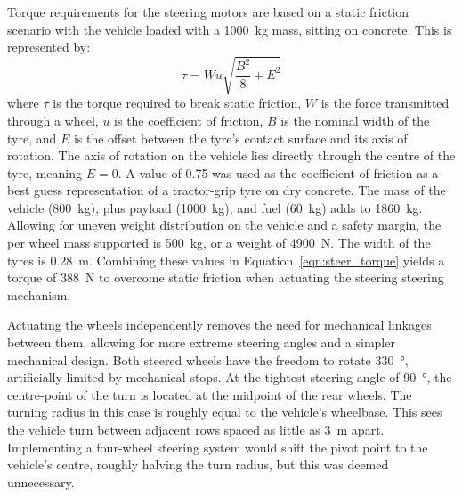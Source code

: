 \documentclass[preprint,authoryear,12pt]{elsarticle}
\begin{document}

        Torque requirements for the steering motors are based on a static friction scenario with the vehicle loaded with a \SI{1000}{\kilo\gram} mass, sitting on concrete.
        This is represented by:
        \begin{equation}
        \label{eqn:steer_torque}
        \tau = W u \sqrt{\frac{B^2}{8} + E^2}
        \end{equation}
        where $\tau$ is the torque required to break static friction, $W$ is the force transmitted through a wheel, $u$ is the coefficient of friction, $B$ is the nominal width of the tyre, and $E$ is the offset between the tyre's contact surface and its axis of rotation.
        The axis of rotation on the vehicle lies directly through the centre of the tyre, meaning $E=0$.
        A value of 0.75 was used as the coefficient of friction as a best guess representation of a tractor-grip tyre on dry concrete.
        The mass of the vehicle (\SI{800}{\kilo\gram}), plus payload (\SI{1000}{\kilo\gram}), and fuel (\SI{60}{\kilo\gram}) adds to \SI{1860}{\kilo\gram}.
        Allowing for uneven weight distribution on the vehicle and a safety margin, the per wheel mass supported is \SI{500}{\kilo\gram}, or a weight of \SI{4900}{\newton}.
        The width of the tyres is \SI{0.28}{\meter}.
        Combining these values in Equation~\ref{eqn:steer_torque} yields a torque of \SI{388}{\newton} to overcome static friction when actuating the steering steering mechanism.

        Actuating the wheels independently removes the need for mechanical linkages between them, allowing for more extreme steering angles and a simpler mechanical design.
        Both steered wheels have the freedom to rotate \SI{330}{\degree}, artificially limited by mechanical stops.
        At the tightest steering angle of \SI{90}{\degree}, the centre-point of the turn is located at the midpoint of the rear wheels.
        The turning radius in this case is roughly equal to the vehicle's wheelbase.
        This sees the vehicle turn between adjacent rows spaced as little as \SI{3}{\meter} apart.
        Implementing a four-wheel steering system would shift the pivot point to the vehicle's centre, roughly halving the turn radius, but this was deemed unnecessary.
\end{document}
